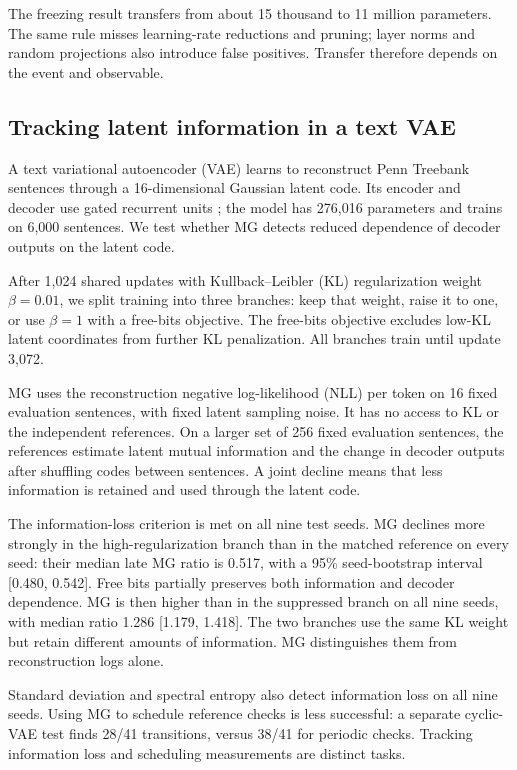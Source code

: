 {The freezing result transfers from about 15 thousand to 11 million parameters. The same rule misses learning-rate reductions and pruning; layer norms and random projections also introduce false positives. Transfer therefore depends on the event and observable.

\subsection{Tracking latent information in a text VAE}\label{sec:vae}
A text variational autoencoder (VAE) learns to reconstruct Penn Treebank sentences \citep{marcus1993building} through a 16-dimensional Gaussian latent code. Its encoder and decoder use gated recurrent units \citep{bowman2016generating}; the model has 276,016 parameters and trains on 6,000 sentences. We test whether MG detects reduced dependence of decoder outputs on the latent code.

After 1,024 shared updates with Kullback--Leibler (KL) regularization weight $\beta=0.01$, we split training into three branches: keep that weight, raise it to one, or use $\beta=1$ with a free-bits objective. The free-bits objective excludes low-KL latent coordinates from further KL penalization. All branches train until update 3,072.

MG uses the reconstruction negative log-likelihood (NLL) per token on 16 fixed evaluation sentences, with fixed latent sampling noise. It has no access to KL or the independent references. On a larger set of 256 fixed evaluation sentences, the references estimate latent mutual information and the change in decoder outputs after shuffling codes between sentences. A joint decline means that less information is retained and used through the latent code.

The information-loss criterion is met on all nine test seeds. MG declines more strongly in the high-regularization branch than in the matched reference on every seed: their median late MG ratio is 0.517, with a 95\% seed-bootstrap interval [0.480, 0.542]. Free bits partially preserves both information and decoder dependence. MG is then higher than in the suppressed branch on all nine seeds, with median ratio 1.286 [1.179, 1.418]. The two branches use the same KL weight but retain different amounts of information. MG distinguishes them from reconstruction logs alone.

Standard deviation and spectral entropy also detect information loss on all nine seeds. Using MG to schedule reference checks is less successful: a separate cyclic-VAE test finds 28/41 transitions, versus 38/41 for periodic checks. Tracking information loss and scheduling measurements are distinct tasks. 

}
